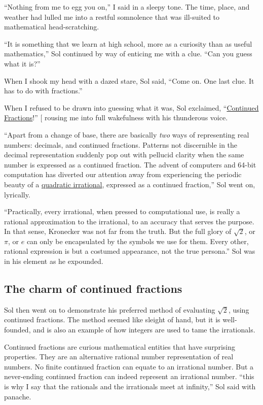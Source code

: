 \documentclass[
  a4paper,
]{article}
\begin{document}
``Nothing from me to egg you on,'' I said in a sleepy tone. The time,
place, and weather had lulled me into a restful somnolence that was
ill-suited to mathematical head-scratching.

``It is something that we learn at high school, more as a curiosity than
as useful mathematics,'' Sol continued by way of enticing me with a
clue. ``Can you guess what it is?''

When I shook my head with a dazed stare, Sol said, ``Come on. One last
clue. It has to do with fractions.''

When I refused to be drawn into guessing what it was, Sol exclaimed,
``\href{https://en.wikipedia.org/wiki/Continued_fraction}{Continued
Fractions}!'' {[}\citeproc{ref-loya2017}{10}{]} rousing me into full
wakefulness with his thunderous voice.

``Apart from a change of base, there are basically \emph{two} ways of
representing real numbers: decimals, and continued fractions. Patterns
not discernible in the decimal representation suddenly pop out with
pellucid clarity when the same number is expressed as a continued
fraction. The advent of computers and 64-bit computation has diverted
our attention away from experiencing the periodic beauty of a
\href{https://en.wikipedia.org/wiki/Quadratic_irrational_number}{quadratic
irrational}, expressed as a continued fraction,'' Sol went on,
lyrically.

``Practically, every irrational, when pressed to computational use, is
really a rational approximation to the irrational, to an accuracy that
serves the purpose. In that sense, Kronecker was not far from the truth.
But the full glory of \(\sqrt{2}\), or \(\pi\), or \(e\) can only be
encapsulated by the symbols we use for them. Every other, rational
expression is but a costumed appearance, not the true persona.'' Sol was
in his element as he expounded.

\subsection{The charm of continued
fractions}\label{the-charm-of-continued-fractions}

Sol then went on to demonstrate his preferred method of evaluating
\(\sqrt{2}\), using continued fractions. The method seemed like sleight
of hand, but it is well-founded, and is also an example of how integers
are used to tame the irrationals.

Continued fractions are curious mathematical entities that have
surprising properties. They are an alternative rational number
representation of real numbers. No finite continued fraction can equate
to an irrational number. But a never-ending continued fraction can
indeed represent an irrational number. ``this is why I say that the
rationals and the irrationals meet at infinity,'' Sol said with panache.
\end{document}
